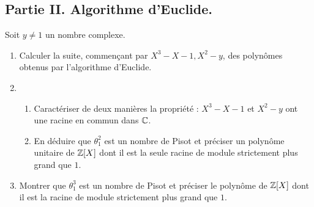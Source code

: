 \subsection*{Partie II. Algorithme d'Euclide.}
Soit $y\neq 1$ un nombre complexe.
\begin{enumerate}
 \item  Calculer la suite, commençant par $X^3-X-1, X^2-y$, des polynômes obtenus par l'algorithme d'Euclide.
 \item 
\begin{enumerate}
 \item Caractériser de deux manières la propriété : $X^3-X-1$ et $X^2-y$ ont une racine en commun dans $\mathbb{C}$.
 \item En déduire que $\theta_1^2$ est un nombre de Pisot et préciser un polynôme unitaire de $\mathbb{Z}[X]$ dont il est la seule racine de module strictement plus grand que $1$.
\end{enumerate}
\item Montrer que $\theta_1^3$ est un nombre de Pisot et préciser le polynôme de $\mathbb{Z}[X]$ dont il est la racine de module strictement plus grand que $1$.
\end{enumerate}


